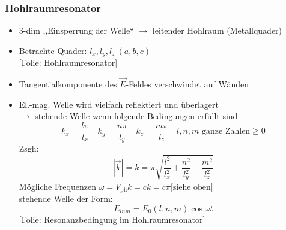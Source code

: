 \documentclass[titlepage,12pt,a4paper,ngerman]{report}
\newcommand{\tx}[1]{\textrm{#1}}
\newcommand{\folie}[1]{\color{gray}[Folie: #1]\color{black}}
\begin{document}
\subsubsection{Hohlraumresonator}
\begin{itemize}
	\item 3-dim ,,Einsperrung der Welle`` $ \rightarrow $ leitender Hohlraum (Metallquader)
	\item Betrachte Quader: $ l_x,l_y,l_z \ (a,b,c)$\\
	\folie{Hohlraumresonator}
	\item Tangentialkomponente des $ \vec{E} $-Feldes verschwindet auf Wänden
	\item El.-mag. Welle wird vielfach reflektiert und überlagert\\
	$ \rightarrow $ stehende Welle wenn folgende Bedingungen erfüllt sind
	$$k_x = \frac{l\pi}{l_x} \quad k_y = \frac{n \pi}{l_y} \quad k_z = \frac{m \pi}{l_z} \quad l,n,m \tx{ ganze Zahlen} \ge 0$$
	Zsgh: $$ |\vec{k}| = k = \pi \sqrt{\frac{l^2}{l_x^2} + \frac{n^2}{l_y^2} + \frac{m^2}{l_z^2}} $$
	Mögliche Frequenzen $ \omega = V_{\tx{ph}} k = ck = c \pi \tx{[siehe oben]} $\\
	stehende Welle der Form:
	$$E_{lnm} = E_0 (l,n,m) \cos \omega t$$
	\folie{Resonanzbedingung im Hohlraumresonator}
\end{itemize}

\end{document}
